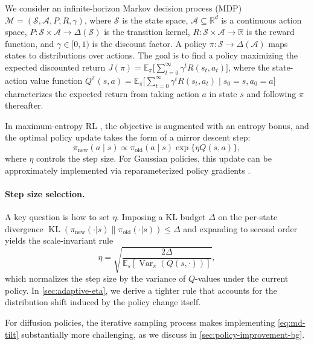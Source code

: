 \documentclass{article}
\theoremstyle{plain}
\theoremstyle{definition}
\theoremstyle{remark}
\newcommand{\E}{\mathbb{E}}
\DeclareMathOperator{\KL}{KL}
\DeclareMathOperator{\Var}{Var}
\begin{document}
We consider an infinite-horizon Markov decision process (MDP) $\mathcal{M} = (\mathcal{S}, \mathcal{A}, P, R, \gamma)$, where $\mathcal{S}$ is the state space, $\mathcal{A} \subseteq \mathbb{R}^d$ is a continuous action space, $P: \mathcal{S} \times \mathcal{A} \to \Delta(\mathcal{S})$ is the transition kernel, $R: \mathcal{S} \times \mathcal{A} \to \mathbb{R}$ is the reward function, and $\gamma \in [0,1)$ is the discount factor.
A policy $\pi: \mathcal{S} \to \Delta(\mathcal{A})$ maps states to distributions over actions.
The goal is to find a policy maximizing the expected discounted return $J(\pi) = \E_\pi\bigl[\sum_{t=0}^\infty \gamma^t R(s_t, a_t)\bigr]$, where the state-action value function $Q^\pi(s,a) = \E_\pi\bigl[\sum_{t=0}^\infty \gamma^t R(s_t,a_t) \mid s_0=s, a_0=a\bigr]$ characterizes the expected return from taking action $a$ in state $s$ and following $\pi$ thereafter.

In maximum-entropy RL \citep{haarnoja2018sac}, the objective is augmented with an entropy bonus, and the optimal policy update takes the form of a mirror descent step:
\begin{equation}
  \pi_{\mathrm{new}}(a\mid s) \propto \pi_\mathrm{old}(a\mid s) \exp\{\eta Q(s,a)\},
  \label{eq:md-tilt}
\end{equation}
where $\eta$ controls the step size.
For Gaussian policies, this update can be approximately implemented via reparameterized policy gradients \citep{haarnoja2018sac}.

\paragraph{Step size selection.}
A key question is how to set $\eta$.
Imposing a KL budget $\Delta$ on the per-state divergence $\KL(\pi_{\mathrm{new}}(\cdot|s) \| \pi_{\mathrm{old}}(\cdot|s)) \le \Delta$ and expanding to second order yields the scale-invariant rule
\begin{equation}
  \eta = \sqrt{\frac{2\Delta}{\E_{s}[\Var_{\pi}(Q(s,\cdot))]}},
  \label{eq:kl-budget-eta}
\end{equation}
which normalizes the step size by the variance of $Q$-values under the current policy.
In \cref{sec:adaptive-eta}, we derive a tighter rule that accounts for the distribution shift induced by the policy change itself.

For diffusion policies, the iterative sampling process makes implementing \cref{eq:md-tilt} substantially more challenging, as we discuss in \cref{sec:policy-improvement-bg}.
\end{document}
